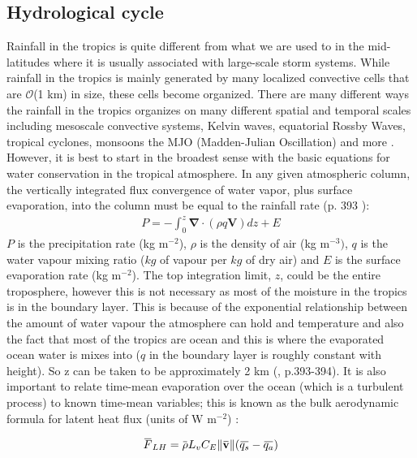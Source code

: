 \documentclass[letterpaper,12pt,titlepage,oneside,final]{book}
\newcommand{\norm}[1]{\lVert#1\rVert}
\newcommand{\overbar}[1]{\mkern 1.5mu\overline{\mkern-1.5mu#1\mkern-1.5mu}\mkern 1.5mu}
\begin{document}
\subsection{Hydrological cycle}\label{hydro}
Rainfall in the tropics is quite different from what we are used to in the mid-latitudes where it is usually associated with large-scale storm systems. While rainfall in the tropics is mainly generated by many localized convective cells that are $\mathcal{O}$(1 km) in size, these cells become organized. There are many different ways the rainfall in the tropics organizes on many different spatial and temporal scales including mesoscale convective systems, Kelvin waves, equatorial Rossby Waves, tropical cyclones, monsoons the MJO (Madden-Julian Oscillation) and more \citep{holton_introduction_2004}. However, it is best to start in the broadest sense with the basic equations for water conservation in the tropical atmosphere. In any given atmospheric column, the vertically integrated flux convergence of water vapor, plus surface evaporation, into the column must be equal to the rainfall rate (p. 393 \citep{holton_introduction_2004}):
\begin{align}
P=-\int_{0}^{z}\mathbf{\nabla}\cdot(\rho{q}\mathbf{V})dz+E
\end{align}
$P$ is the precipitation rate (kg m$^{-2}$), $\rho$ is the density of air (kg m$^{-3})$, $q$ is the water vapour mixing ratio ($kg$ of vapour per $kg$ of dry air) and $E$ is the surface evaporation rate (kg m$^{-2}$). The top integration limit, $z$, could be the entire troposphere, however this is not necessary as most of the moisture in the tropics is in the boundary layer. This is because of the exponential relationship between the amount of water vapour the atmosphere can hold and temperature and also the fact that most of the tropics are ocean and this is where the evaporated ocean water is mixes into ($q$ in the boundary layer is roughly constant with height). So z can be taken to be approximately 2 km (\citep{holton_introduction_2004}, p.393-394). It is also important to relate time-mean evaporation over the ocean (which is a turbulent process) to known time-mean variables; this is known as the bulk aerodynamic formula for latent heat flux (units of W m$^{-2}$) \citep{katsaros_evaporation_2001}:

\begin{align}
\overbar{F}_{LH}=\overbar{\rho}{L_{v}}C_{E}\norm{\overbar{\textbf{v}}}(\overbar{q_{s}}-\overbar{q_{a}})
\end{align}
\end{document}
